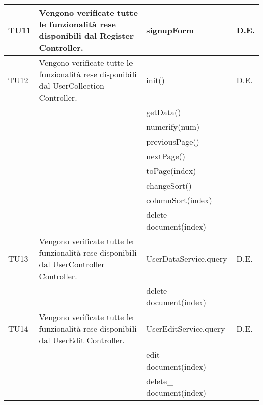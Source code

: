 \begin{center}
\begin{longtable}{|p{1cm}|p{5cm}|p{6cm}|p{1cm}|}
\midrule
TU11
& Vengono verificate tutte le funzionalità rese disponibili dal Register Controller.
& signupForm
& D.E.\\


\midrule
TU12
& Vengono verificate tutte le funzionalità rese disponibili dal UserCollection Controller.
& init()
& D.E.\\
& & getData() &\\
& & numerify(num) &\\
& & previousPage() &\\
& & nextPage() &\\
& & toPage(index) &\\
& & changeSort() &\\
& & columnSort(index) &\\
& & delete\_ document(index) &\\


\midrule
TU13
& Vengono verificate tutte le funzionalità rese disponibili dal UserController Controller.
& UserDataService.query
& D.E.\\
& & delete\_ document(index) &\\



\midrule
TU14
& Vengono verificate tutte le funzionalità rese disponibili dal UserEdit Controller.
& UserEditService.query
& D.E.\\
& & edit\_ document(index) &\\
& & delete\_ document(index) &\\





\end{longtable}
\end{center}


